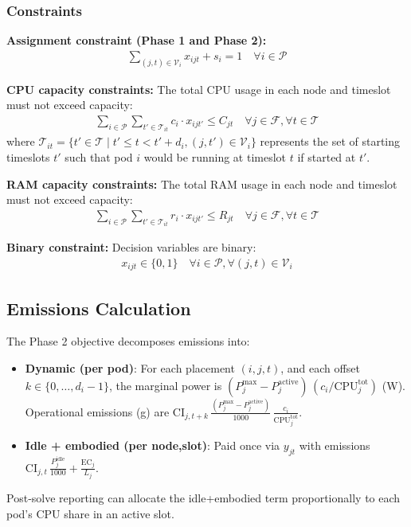 \documentclass{article}
\begin{document}
\subsubsection{Constraints}

\textbf{Assignment constraint (Phase 1 and Phase 2):}
\begin{align}
\sum_{(j,t) \in \mathcal{V}_i} x_{ijt} + s_i = 1 \quad \forall i \in \mathcal{P}
\end{align}

\textbf{CPU capacity constraints:} The total CPU usage in each node and timeslot must not exceed capacity:
\begin{align}
\sum_{i \in \mathcal{P}} \sum_{t' \in \mathcal{T}_{it}} c_i \cdot x_{ijt'} \leq C_{jt} \quad \forall j \in \mathcal{F}, \forall t \in \mathcal{T}
\end{align}
where $\mathcal{T}_{it} = \{t' \in \mathcal{T} \mid t' \leq t < t' + d_i, (j,t') \in \mathcal{V}_i\}$ represents the set of starting timeslots $t'$ such that pod $i$ would be running at timeslot $t$ if started at $t'$.

\textbf{RAM capacity constraints:} The total RAM usage in each node and timeslot must not exceed capacity:
\begin{align}
\sum_{i \in \mathcal{P}} \sum_{t' \in \mathcal{T}_{it}} r_i \cdot x_{ijt'} \leq R_{jt} \quad \forall j \in \mathcal{F}, \forall t \in \mathcal{T}
\end{align}

\textbf{Binary constraint:} Decision variables are binary:
\begin{align}
x_{ijt} \in \{0,1\} \quad \forall i \in \mathcal{P}, \forall (j,t) \in \mathcal{V}_i
\end{align}

\subsection{Emissions Calculation}

The Phase 2 objective decomposes emissions into:
\begin{itemize}
  \item \textbf{Dynamic (per pod)}: For each placement $(i,j,t)$, and each offset $k \in \{0,\ldots,d_i-1\}$, the marginal power is $(P^{\max}_j - P^{\text{active}}_j)\, (c_i/\text{CPU}^{\text{tot}}_j)$ (W). Operational emissions (g) are $\text{CI}_{j,t+k}\, \frac{(P^{\max}_j - P^{\text{active}}_j)}{1000}\, \frac{c_i}{\text{CPU}^{\text{tot}}_j}$.
  \item \textbf{Idle + embodied (per node,slot)}: Paid once via $y_{jt}$ with emissions $\text{CI}_{j,t}\, \frac{P^{\text{idle}}_j}{1000} + \frac{\text{EC}_j}{L_j}$.
\end{itemize}
Post‑solve reporting can allocate the idle+embodied term proportionally to each pod's CPU share in an active slot.
\end{document}
